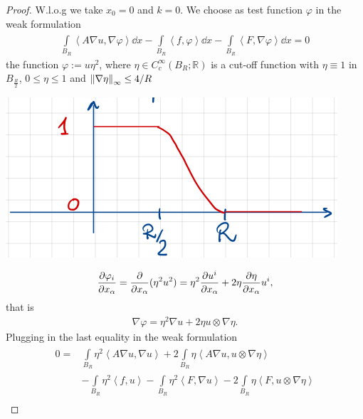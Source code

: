 \begin{proof}
	W.l.o.g we take \(x_{0}=0\) and \(k=0\). We choose as test function \(\varphi \) in the weak formulation
	\begin{gather}
		\int\limits_{B_{R}}^{} \left\langle  A \nabla u, \nabla \varphi \right\rangle \dd{x} - \int\limits_{B_{R}}^{} \left\langle  f,\varphi \right\rangle \dd{x} -\int\limits_{B_{R}}^{} \left\langle  F,\nabla\varphi \right\rangle \dd{x} =0
	\end{gather}
	the function \(\varphi:= u \eta^{2}\), where \(\eta \in C_{c}^{\infty}(B_{R}; \mathbb{R})\) is a cut-off function with \(\eta \equiv 1\) in \(B_{\frac{R}{2}}\), \(0 \leq \eta \leq 1\) and \(\norm{\nabla \eta}_{\infty} \leq \frac{4}{R}\)
	\begin{center}
		\includegraphics[scale=0.45]{pictures/picture01.png}
	\end{center}
	\begin{gather}
		\pdv[{}]{\varphi_{i}}{x_{\alpha}} = \pdv[]{}{x_{\alpha}} (\eta^{2}u^{2}) = \eta^{2}\pdv[]{u^{i}}{x_{\alpha}}+2 \eta \pdv[]{\eta}{x_{\alpha}} u^{i},
	\end{gather}
	that is
	\begin{gather}
		\nabla \varphi = \eta^{2} \nabla u + 2 \eta u \otimes \nabla \eta.
	\end{gather}
	Plugging in the last equality in the weak formulation
	\begin{align}
		0= & \int\limits_{B_{R}}^{} \eta^{2} \left\langle A \nabla u , \nabla u \right\rangle + 2 \int\limits_{B_{R}}^{} \eta \left\langle A \nabla u , u \otimes \nabla \eta \right\rangle                                                  \\
		   & - \int\limits_{B_{R}}^{} \eta^{2} \left\langle f, u \right\rangle - \int\limits_{B_{R}}^{} \eta^{2} \left\langle F, \nabla u \right\rangle - 2 \int\limits_{B_{R}}^{} \eta \left\langle  F, u \otimes \nabla \eta \right\rangle \\

\end{align}
\end{proof}
